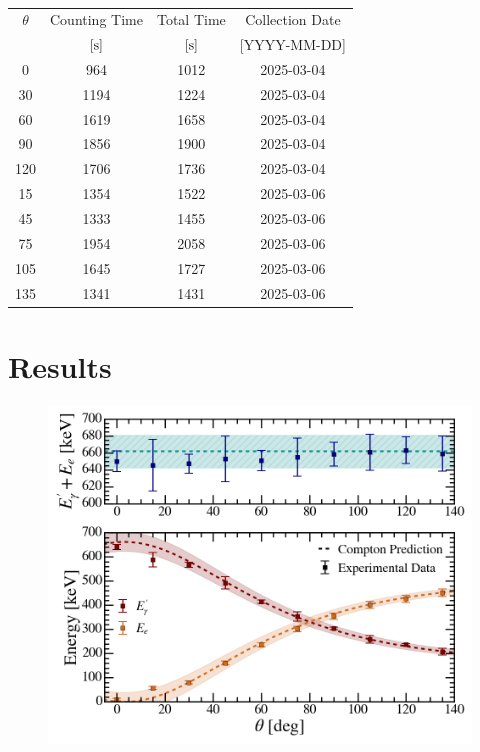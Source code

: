 \documentclass[aps,twocolumn,secnumarabic,balancelastpage,amsmath,amssymb,nofootinbib,floatfix]{revtex4-1}
\begin{document}
\begin{table}
    \centering
    \addtolength{\tabcolsep}{3pt}
    \def\arraystretch{1.5}
    \begin{tabular}{c c c c}
        \hline
        $\theta$ & Counting Time & Total Time & Collection Date \\ [0ex]
         & $[\rm{s}]$ & $[\rm{s}]$ & [YYYY-MM-DD] \\ [1ex]
        \hline\hline

        0 & 964 & 1012 & 2025-03-04 \\
        30 & 1194 & 1224 & 2025-03-04 \\
        60 & 1619 & 1658 & 2025-03-04 \\
        90 & 1856 & 1900 & 2025-03-04 \\
        120 & 1706 & 1736 & 2025-03-04 \\
        15 & 1354 & 1522 & 2025-03-06 \\
        45 & 1333 & 1455 & 2025-03-06 \\
        75 & 1954 & 2058 & 2025-03-06 \\
        105 & 1645 & 1727 & 2025-03-06 \\
        135 & 1341 & 1431 & 2025-03-06 \\
        
        \hline
        
    \end{tabular}
    \caption{}
    \label{tab:data_collection}    
\end{table}


\section{Results}
\label{sec:result}

\begin{figure}
    \centering
    \includegraphics[width=0.49 \textwidth]{Figures/energy_angle_dependency.png}
    \caption{}
    \label{fig:energy_angle_dependency}
\end{figure}
\end{document}
